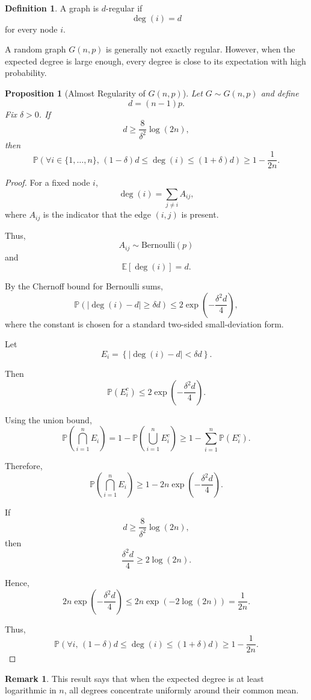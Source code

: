 \documentclass[12pt,oneside]{book}
\numberwithin{equation}{section}
\theoremstyle{definition}
\newtheorem{definition}{Definition}[section]
\newtheorem{remark}{Remark}[section]
\theoremstyle{plain}
\newtheorem{proposition}{Proposition}[section]
\theoremstyle{remark}
\newcommand{\E}{\mathbb{E}}
\newcommand{\Prob}{\mathbb{P}}
\newcommand{\Bern}{\mathrm{Bernoulli}}
\begin{document}
\begin{definition}
A graph is $d$-regular if
\[
\deg(i)=d
\]
for every node $i$.
\end{definition}

A random graph $G(n,p)$ is generally not exactly regular. However, when the expected degree is large enough, every degree is close to its expectation with high probability.

\begin{proposition}[Almost Regularity of $G(n,p)$]
Let $G\sim G(n,p)$ and define
\[
d=(n-1)p.
\]
Fix $\delta>0$. If
\[
d\geq \frac{8}{\delta^2}\log(2n),
\]
then
\[
\Prob\left(
\forall i\in\{1,\dots,n\},
\,
(1-\delta)d
\leq
\deg(i)
\leq
(1+\delta)d
\right)
\geq
1-\frac{1}{2n}.
\]
\end{proposition}

\begin{proof}
For a fixed node $i$,
\[
\deg(i)=\sum_{j\neq i} A_{ij},
\]
where $A_{ij}$ is the indicator that the edge $(i,j)$ is present.

Thus,
\[
A_{ij}\sim \Bern(p)
\]
and
\[
\E[\deg(i)]=d.
\]

By the Chernoff bound for Bernoulli sums,
\[
\Prob\left(
|\deg(i)-d|\geq \delta d
\right)
\leq
2\exp\left(
-\frac{\delta^2 d}{4}
\right),
\]
where the constant is chosen for a standard two-sided small-deviation form.

Let
\[
E_i
=
\left\{
|\deg(i)-d|<\delta d
\right\}.
\]

Then
\[
\Prob(E_i^c)
\leq
2\exp\left(
-\frac{\delta^2 d}{4}
\right).
\]

Using the union bound,
\[
\Prob\left(
\bigcap_{i=1}^n E_i
\right)
=
1-
\Prob\left(
\bigcup_{i=1}^n E_i^c
\right)
\geq
1-\sum_{i=1}^n \Prob(E_i^c).
\]

Therefore,
\[
\Prob\left(
\bigcap_{i=1}^n E_i
\right)
\geq
1-
2n\exp\left(
-\frac{\delta^2 d}{4}
\right).
\]

If
\[
d\geq \frac{8}{\delta^2}\log(2n),
\]
then
\[
\frac{\delta^2 d}{4}
\geq
2\log(2n).
\]

Hence,
\[
2n\exp\left(
-\frac{\delta^2 d}{4}
\right)
\leq
2n\exp(-2\log(2n))
=
\frac{1}{2n}.
\]

Thus,
\[
\Prob\left(
\forall i,
\,
(1-\delta)d
\leq
\deg(i)
\leq
(1+\delta)d
\right)
\geq
1-\frac{1}{2n}.
\]
\end{proof}

\begin{remark}
This result says that when the expected degree is at least logarithmic in $n$, all degrees concentrate uniformly around their common mean.
\end{remark}
\end{document}
